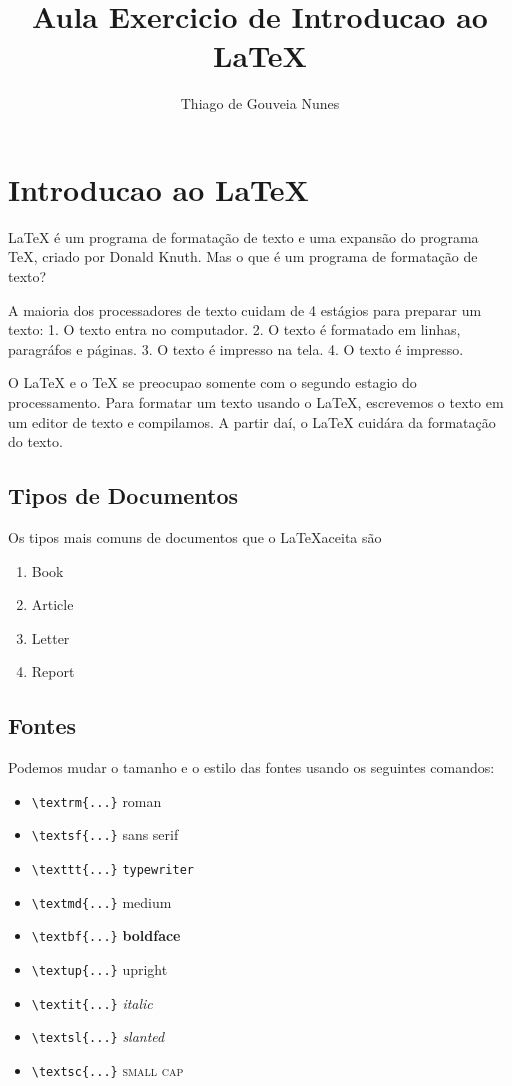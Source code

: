\documentclass[12pt,onecolumn]{article}
\begin{document}
\title{Aula Exercicio de Introducao ao \LaTeX}
\author{Thiago de Gouveia Nunes}
\maketitle

\section{Introducao ao \LaTeX}
    LaTeX é um programa de formatação de texto e uma expansão do programa
    TeX, criado por Donald Knuth. Mas o que é um programa de
    formatação de texto?

    A maioria dos processadores de texto cuidam de 4 estágios para preparar
    um texto:
    1. O texto entra no computador.
    2. O texto é formatado em linhas, paragráfos e páginas.
    3. O texto é impresso na tela.
    4. O texto é impresso.

    O LaTeX e o TeX se preocupao somente com o segundo estagio
    do processamento. Para formatar um texto usando o LaTeX, escrevemos
    o texto em um editor de texto e compilamos. A partir daí, o \LaTeX
    cuidára da formatação do texto.

\subsection{Tipos de Documentos}
    Os tipos mais comuns de documentos que o \LaTeX aceita são
    \begin{enumerate}
    \item Book
    \item Article
    \item Letter
    \item Report
    \end{enumerate}

\subsection{Fontes}

    Podemos mudar o tamanho e o estilo das fontes usando os seguintes
    comandos:
    \begin{itemize}
    \item \verb#\textrm{...}# \textrm{roman}
    \item \verb#\textsf{...}# \textsf{sans serif}
    \item \verb#\texttt{...}# \texttt{typewriter}
    \item \verb#\textmd{...}# \textmd{medium}
    \item \verb#\textbf{...}# \textbf{boldface}
    \item \verb#\textup{...}# \textup{upright}
    \item \verb#\textit{...}# \textit{italic}
    \item \verb#\textsl{...}# \textsl{slanted}
    \item \verb#\textsc{...}# \textsc{small cap}
    \end{itemize}
\end{document}
